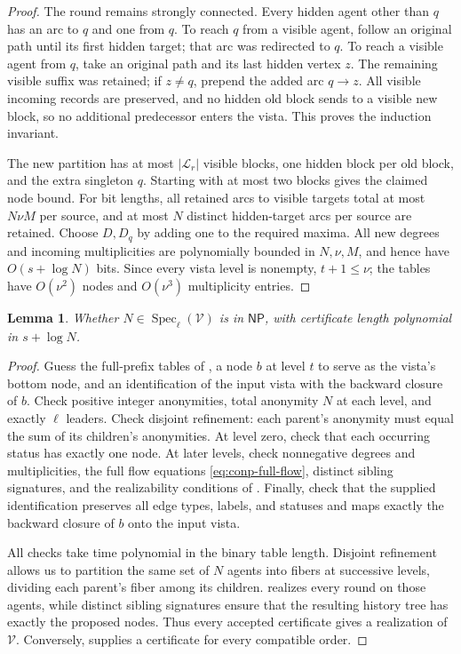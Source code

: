 \documentclass[11pt]{article}
\newtheorem{lemma}{Lemma}
\begin{document}
\begin{proof}
The round remains strongly connected.  Every hidden agent other
than \(q\) has an arc to \(q\) and one from \(q\).  To reach
\(q\) from a visible agent, follow an original path until its
first hidden target; that arc was redirected to \(q\).  To reach
a visible agent from \(q\), take an original path and its last
hidden vertex \(z\).  The remaining visible suffix was retained;
if \(z\neq q\), prepend the added arc \(q\to z\).
All visible incoming records are preserved, and no hidden old
block sends to a visible new block, so no additional predecessor
enters the vista.  This proves the induction invariant.

The new partition has at most \(|\mathcal L_r|\) visible blocks,
one hidden block per old block, and the extra singleton \(q\).
Starting with at most two blocks gives the claimed node bound.
For bit lengths, all retained arcs to visible targets total at most
\(N\nu M\) per source, and at most \(N\) distinct hidden-target
arcs per source are retained.  Choose \(D,D_q\) by adding one to
the required maxima.  All new degrees and incoming multiplicities
are polynomially bounded in \(N,\nu,M\), and hence have
\(O(s+\log N)\) bits.  Since every vista level is nonempty,
\(t+1\leq\nu\); the tables have \(O(\nu^2)\) nodes and
\(O(\nu^3)\) multiplicity entries.
\end{proof}

\begin{lemma}
\label{lem:conp-fixed-order}
Whether \(N\in\operatorname{Spec}_{\ell}(\mathcal V)\) is in
\(\mathsf{NP}\), with certificate length polynomial in
\(s+\log N\).
\end{lemma}

\begin{proof}
Guess the full-prefix tables of ,
a node \(b\) at level \(t\) to serve as the vista's bottom node,
and an identification of the input vista with the backward closure
of \(b\). Check positive integer anonymities, total anonymity \(N\)
at each level, and exactly \(\ell\) leaders. Check disjoint refinement: each parent's
anonymity must equal the sum of its children's anonymities.
At level zero, check that each occurring status has exactly one node.
At later levels, check nonnegative degrees and multiplicities,
the full flow equations \eqref{eq:conp-full-flow}, distinct sibling
signatures, and the realizability conditions of
. Finally, check that the supplied
identification preserves all edge types, labels, and statuses
and maps exactly the backward closure of \(b\) onto the input vista.

All checks take time polynomial in the binary table length.
Disjoint refinement allows us to partition the same
set of \(N\) agents into fibers at successive levels, dividing
each parent's fiber among its children.
 realizes every round on those agents,
while distinct sibling signatures ensure that the resulting
history tree has exactly the proposed nodes.
Thus every accepted certificate gives a realization of
\(\mathcal V\). Conversely, 
supplies a certificate for every compatible order.
\end{proof}
\end{document}
